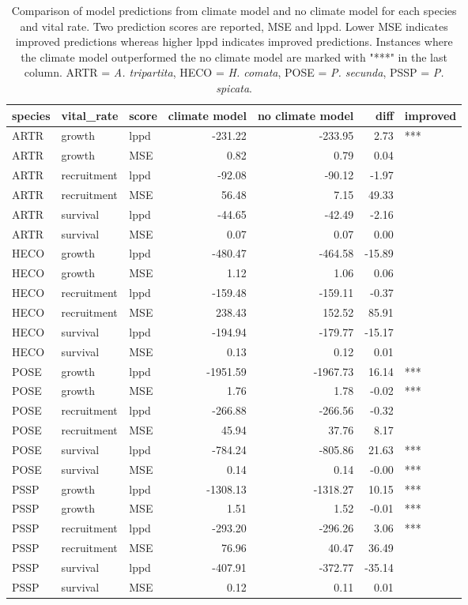 \begin{table}[ht]
\centering
\caption{Comparison of model predictions from climate model and no climate model for each species and vital rate.  Two prediction scores are reported, MSE and lppd. Lower MSE indicates improved predictions whereas higher lppd indicates improved predictions.  Instances where the climate model outperformed the no climate model are marked with "***" in the last column. ARTR = \textit{A. tripartita}, HECO = \textit{H. comata}, POSE = \textit{P. secunda}, PSSP = \textit{P. spicata}.} 
\label{table:overallPreds}
\begin{tabular}{lllrrrl}
  \hline
species & vital\_rate & score & climate model & no climate model & diff & improved \\ 
  \hline
ARTR & growth & lppd & -231.22 & -233.95 & 2.73 & *** \\ 
  ARTR & growth & MSE & 0.82 & 0.79 & 0.04 &  \\ 
  ARTR & recruitment & lppd & -92.08 & -90.12 & -1.97 &  \\ 
  ARTR & recruitment & MSE & 56.48 & 7.15 & 49.33 &  \\ 
  ARTR & survival & lppd & -44.65 & -42.49 & -2.16 &  \\ 
  ARTR & survival & MSE & 0.07 & 0.07 & 0.00 &  \\ 
  HECO & growth & lppd & -480.47 & -464.58 & -15.89 &  \\ 
  HECO & growth & MSE & 1.12 & 1.06 & 0.06 &  \\ 
  HECO & recruitment & lppd & -159.48 & -159.11 & -0.37 &  \\ 
  HECO & recruitment & MSE & 238.43 & 152.52 & 85.91 &  \\ 
  HECO & survival & lppd & -194.94 & -179.77 & -15.17 &  \\ 
  HECO & survival & MSE & 0.13 & 0.12 & 0.01 &  \\ 
  POSE & growth & lppd & -1951.59 & -1967.73 & 16.14 & *** \\ 
  POSE & growth & MSE & 1.76 & 1.78 & -0.02 & *** \\ 
  POSE & recruitment & lppd & -266.88 & -266.56 & -0.32 &  \\ 
  POSE & recruitment & MSE & 45.94 & 37.76 & 8.17 &  \\ 
  POSE & survival & lppd & -784.24 & -805.86 & 21.63 & *** \\ 
  POSE & survival & MSE & 0.14 & 0.14 & -0.00 & *** \\ 
  PSSP & growth & lppd & -1308.13 & -1318.27 & 10.15 & *** \\ 
  PSSP & growth & MSE & 1.51 & 1.52 & -0.01 & *** \\ 
  PSSP & recruitment & lppd & -293.20 & -296.26 & 3.06 & *** \\ 
  PSSP & recruitment & MSE & 76.96 & 40.47 & 36.49 &  \\ 
  PSSP & survival & lppd & -407.91 & -372.77 & -35.14 &  \\ 
  PSSP & survival & MSE & 0.12 & 0.11 & 0.01 &  \\ 
   \hline
\end{tabular}
\end{table}
